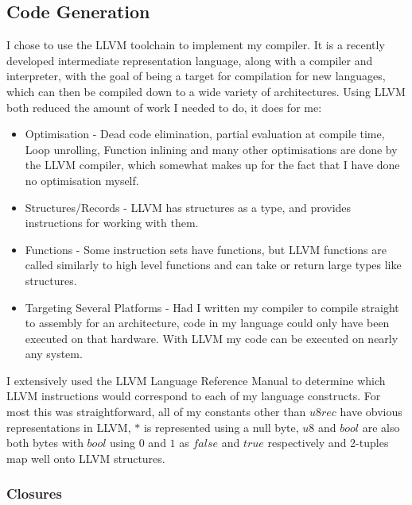 \subsection{Code Generation}

I chose to use the LLVM toolchain to implement my compiler.
It is a recently developed intermediate representation language, along with a compiler and interpreter,
with the goal of being a target for compilation for new languages, which can then be compiled down to
a wide variety of architectures.
Using LLVM both reduced the amount of work I needed to do, it does for me:
\begin{itemize}
    \item Optimisation -
    Dead code elimination,
    partial evaluation at compile time,
    Loop unrolling,
    Function inlining
    and many other optimisations are done by the LLVM compiler, which somewhat makes up for the fact that
    I have done no optimisation myself.
    \item Structures/Records -
    LLVM has structures as a type, and provides instructions for working with them.
    \item Functions -
    Some instruction sets have functions, but LLVM functions are called similarly to high level functions
    and can take or return large types like structures.
    \item Targeting Several Platforms -
    Had I written my compiler to compile straight to assembly for an architecture, code in my language could
    only have been executed on that hardware.
    With LLVM my code can be executed on nearly any system.
\end{itemize}
I extensively used the LLVM Language Reference Manual \cite{llvm} to determine which LLVM instructions
would correspond to each of my language constructs.
For most this was straightforward, all of my constants other than $u8rec$ have obvious representations
in LLVM, $\ast$ is represented using a null byte, $u8$ and $bool$ are also both bytes with $bool$ using
$0$ and $1$ as $false$ and $true$ respectively and 2-tuples map well onto LLVM structures.

\subsubsection{Closures}


